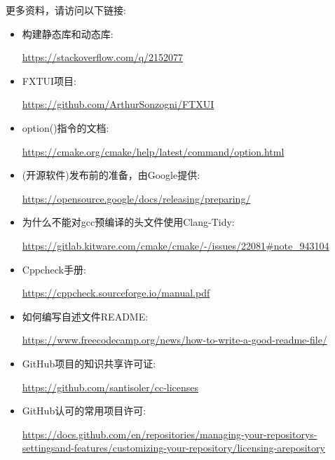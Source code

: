 更多资料，请访问以下链接:

\begin{itemize}
\item 
构建静态库和动态库:

\url{https://stackoverflow.com/q/2152077}

\item 
FXTUI项目:

\url{https://github.com/ArthurSonzogni/FTXUI}

\item 
option()指令的文档: 

\url{https://cmake.org/cmake/help/latest/command/option.html}

\item 
(开源软件)发布前的准备，由Google提供:

\url{https://opensource.google/docs/releasing/preparing/}

\item 
为什么不能对gcc预编译的头文件使用Clang-Tidy:

\url{https://gitlab.kitware.com/cmake/cmake/-/issues/22081\#note\_943104}

\item 
Cppcheck手册:

\url{https://cppcheck.sourceforge.io/manual.pdf}

\item 
如何编写自述文件README:

\url{https://www.freecodecamp.org/news/how-to-write-a-good-readme-file/}

\item 
GitHub项目的知识共享许可证:

\url{https://github.com/santisoler/cc-licenses}

\item 
GitHub认可的常用项目许可:

\url{https://docs.github.com/en/repositories/managing-your-repositorys-settingsand-features/customizing-your-repository/licensing-arepository}
\end{itemize}
